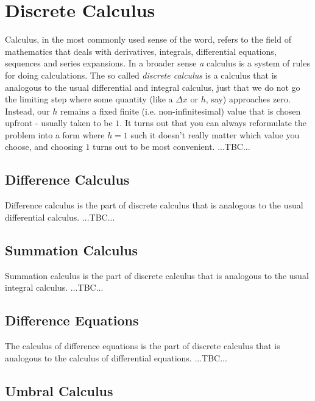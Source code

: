 \chapter{Discrete Calculus}
Calculus, in the most commonly used sense of the word, refers to the field of mathematics that deals with derivatives, integrals, differential equations, sequences and series expansions. In a broader sense \emph{a} calculus is a system of rules for doing calculations. The so called \emph{discrete calculus} is a calculus that is analogous to the usual differential and integral calculus, just that we do not go the limiting step where some quantity (like a $\Delta x$ or $h$, say) approaches zero. Instead, our $h$ remains a fixed finite (i.e. non-infinitesimal) value that is chosen upfront - usually taken to be $1$. It turns out that you can always reformulate the problem into a form where $h = 1$ such it doesn't really matter which value you choose, and choosing $1$ turns out to be most convenient. ...TBC...




\section{Difference Calculus}
Difference calculus is the part of discrete calculus that is analogous to the usual differential calculus. ...TBC...


\section{Summation Calculus}
Summation calculus is the part of discrete calculus that is analogous to the usual integral calculus. ...TBC...

\section{Difference Equations}
The calculus of difference equations is the part of discrete calculus that is analogous to the calculus of differential equations. ...TBC...



\section{Umbral Calculus}






\begin{comment}


Why don't they teach Newton's calculus of 'What comes next?'
https://www.youtube.com/watch?v=4AuV93LOPcE

\end{comment}